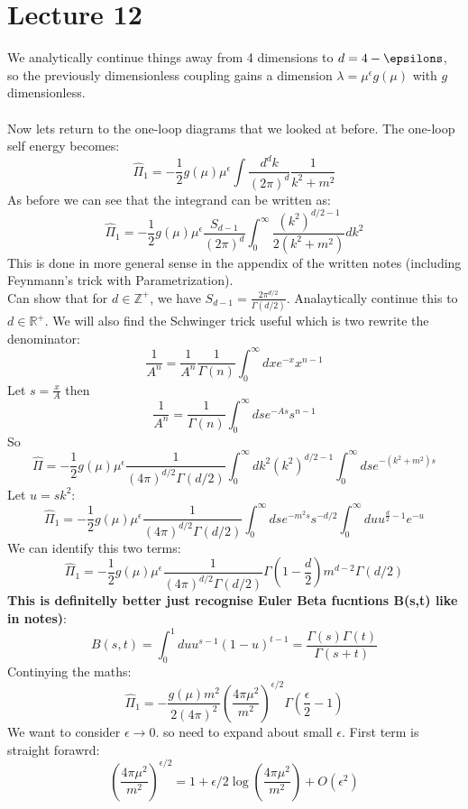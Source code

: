 \documentclass{article}
\begin{document}
\section{Lecture 12}
We analytically continue things away from 4 dimensions to $d= 4-\epsilons$, so the previously dimensionless coupling gains a dimension $\lambda = \mu^{\epsilon} g(\mu)$ with $g$ dimensionless.\\\\
Now lets return to the one-loop diagrams that we looked at before. The one-loop self energy becomes:
$$
\hat \Pi_1 = - \frac{1}{2} g(\mu) \mu^{\epsilon} \int \frac{d^d k}{(2\pi)^d} \frac{1}{k^2 + m^2}
$$
As before we can see that the integrand can be written as:
$$
\hat \Pi_1 = - \frac{1}{2} g(\mu) \mu^{\epsilon} \frac{S_{d-1}}{(2 \pi)^d} \int_0^{\infty} \frac{(k^2)^{d/2 - 1}}{2( k^2 + m^2) } dk^2
$$
This is done in more general sense in the appendix of the written notes (including Feynmann's trick with Parametrization).\\
Can show that for $d \in \mathbb{Z}^+$, we have $S_{d-1} = \frac{2 \pi^{d/2}}{\Gamma (d/2)}$. Analaytically continue this to $d \in \mathbb{R}^+$. We will also find the Schwinger trick useful which is two rewrite the denominator:
$$
\frac{1}{A^n} = \frac{1}{A^n} \frac{1}{\Gamma(n)} \int_0^{\infty} dx e^{-x} x^{n-1} 
$$
Let $s = \frac{x}{A}$ then 
$$
\frac{1}{A^n} = \frac{1}{\Gamma(n)} \int^{\infty}_0 ds e^{-As} s^{n-1}
$$
So
$$
\hat \Pi = - \frac{1}{2} g(\mu) \mu^{\epsilon} \frac{1}{(4\pi)^{d/2} \Gamma(d/2)} \int_0^{\infty} dk^2 (k^2)^{d/2-1} \int_0^{\infty} ds e^{-(k^2+m^2)s}
$$
Let $u = sk^2$:
$$
\hat \Pi_1 = - \frac{1}{2} g( \mu) \mu^{\epsilon} \frac{1}{(4\pi)^{d/2} \Gamma(d/2)} \int_0^{\infty} ds e^{-m^2 s} s^{-d/2} \int^{\infty}_0 du u^{\frac{d}{2} - 1} e^{-u}
$$
We can identify this two terms:
$$
\hat \Pi_1 = - \frac{1}{2} g(\mu) \mu^{\epsilon} \frac{1}{(4\pi)^{d/2} \Gamma(d/2)} \Gamma( 1- \frac{d}{2}) m^{d-2} \Gamma(d/2)
$$
\textbf{This is definitelly better just recognise Euler Beta fucntions B(s,t) like in notes)}:
        $$
        B(s,t) = \int^1_0 du u^{s-1} (1-u)^{t-1} = \frac{\Gamma(s) \Gamma(t)}{\Gamma(s+t)}
        $$
        Continying the maths:
        $$
        \hat \Pi_1 = - \frac{g(\mu) m^2}{2 (4 \pi)^2} ( \frac{4\pi \mu^2}{ m^2} )^{\epsilon/2}\Gamma( \frac{\epsilon}{2} - 1)
        $$
        We want to consider $\epsilon \rightarrow 0$. so need to expand about small $\epsilon$. First term is straight forawrd:
        $$
        ( \frac{4\pi \mu^2}{ m^2} )^{\epsilon/2} = 1 + \epsilon/2 \log ( \frac{4\pi \mu^2}{ m^2} ) + O(\epsilon^2)
        $$
\end{document}
